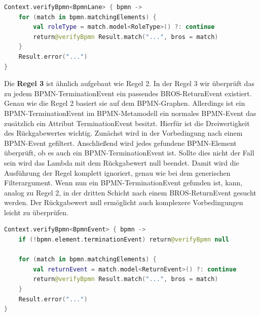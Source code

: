 \begin{lstlisting}[language=Kotlin, caption=Implementierung von Regel 2, label=lst:implementation_rule_2]
Context.verifyBpmn<BpmnLane> { bpmn ->
    for (match in bpmn.matchingElements) {
        val roleType = match.model<RoleType>() ?: continue
        return@verifyBpmn Result.match("...", bros = match)
    }
    Result.error("...")
}
\end{lstlisting}

Die \textbf{Regel 3} ist ähnlich aufgebaut wie Regel 2.
In der Regel 3 wir überprüft das zu jedem BPMN-TerminationEvent ein passendes BROS-ReturnEvent existiert.
Genau wie die Regel 2 basiert sie auf dem BPMN-Graphen.
Allerdings ist ein BPMN-TerminationEvent im BPMN-Metamodell ein normales BPMN-Event das zusätzlich ein Attribut TerminationEvent besitzt.
Hierfür ist die Dreiwertigkeit des Rückgabewertes wichtig.
Zunächst wird in der Vorbedingung nach einem BPMN-Event gefiltert.
Anschließend wird jedes gefundene BPMN-Element überprüft, ob es auch ein BPMN-TerminationEvent ist.
Sollte dies nicht der Fall sein wird das Lambda mit dem Rückgabewert null beendet.
Damit wird die Ausführung der Regel komplett ignoriert, genau wie bei dem generischen Filterargument.
Wenn nun ein BPMN-TerminationEvent gefunden ist, kann, analog zu Regel 2, in der dritten Schicht nach einem BROS-ReturnEvent gesucht werden.
Der Rückgabewert null ermöglicht auch komplexere Vorbedingungen leicht zu überprüfen.

\begin{lstlisting}[language=Kotlin, caption=Implementierung von Regel 3, label=lst:implementation_rule_3]
Context.verifyBpmn<BpmnEvent> { bpmn ->
    if (!bpmn.element.terminationEvent) return@verifyBpmn null

    for (match in bpmn.matchingElements) {
        val returnEvent = match.model<ReturnEvent>() ?: continue
        return@verifyBpmn Result.match("...", bros = match)
    }
    Result.error("...")
}
\end{lstlisting}

